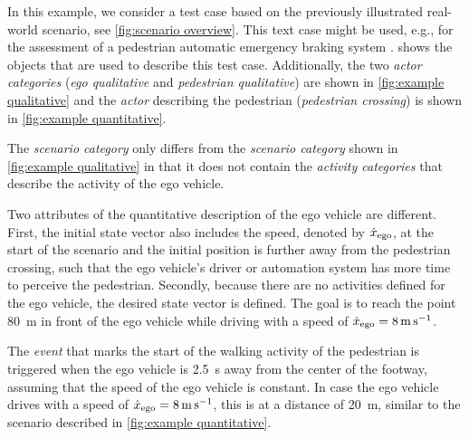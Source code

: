 In this example, we consider a test case based on the previously illustrated real-world scenario, see \cref{fig:scenario overview}. This text case might be used, e.g., for the assessment of a pedestrian automatic emergency braking system \autocite{seiniger2015test}.  shows the objects that are used to describe this test case. Additionally, the two \textit{actor categories} (\emph{ego qualitative} and \emph{pedestrian qualitative}) are shown in \cref{fig:example qualitative} and the \textit{actor} describing the pedestrian (\emph{pedestrian crossing}) is shown in \cref{fig:example quantitative}.



The \textit{scenario category} only differs from the \textit{scenario category} shown in \cref{fig:example qualitative} in that it does not contain the \textit{activity categories} that describe the activity of the ego vehicle.

Two attributes of the quantitative description of the ego vehicle are different. First, the initial state vector also includes the speed, denoted by $\dot{x}_{\mathrm{ego}}$, at the start of the scenario and the initial position is further away from the pedestrian crossing, such that the ego vehicle's driver or automation system has more time to perceive the pedestrian. 
Secondly, because there are no activities defined for the ego vehicle, the desired state vector is defined. The goal is to reach the point \SI{80}{\meter} in front of the ego vehicle while driving with a speed of $\dot{x}_{\mathrm{ego}}=\SI{8}{\meter\per\second}$.

The \textit{event} that marks the start of the walking activity of the pedestrian is triggered when the ego vehicle is \SI{2.5}{\second} away from the center of the footway, assuming that the speed of the ego vehicle is constant. In case the ego vehicle drives with a speed of $\dot{x}_{\mathrm{ego}}=\SI{8}{\meter\per\second}$, this is at a distance of \SI{20}{\meter}, similar to the scenario described in \cref{fig:example quantitative}.

